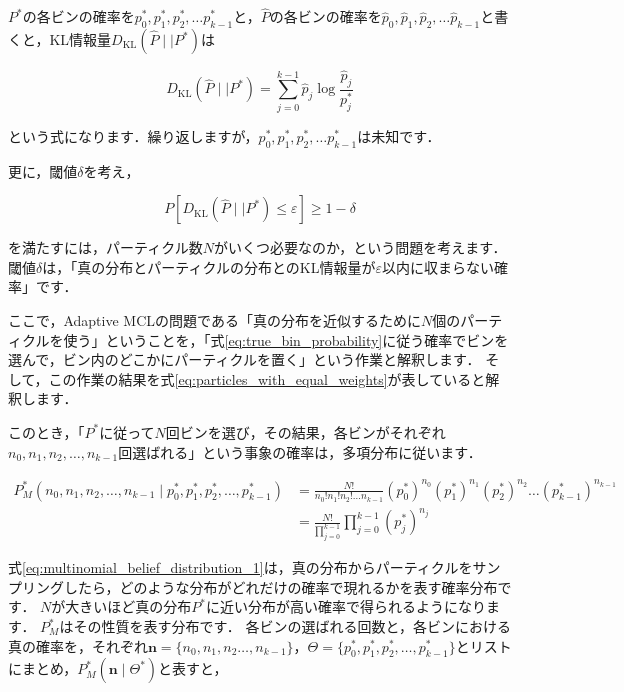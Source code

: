 \documentclass[{../../master}]{subfiles}
\begin{document}
$P^{*}$の各ビンの確率を$p^{*}_{0}, p^{*}_{1}, p^{*}_{2}, \ldots p^{*}_{k-1}$と，$\hat{P}$の各ビンの確率を$\hat{p}_{0}, \hat{p}_{1}, \hat{p}_{2}, \ldots \hat{p}_{k-1}$と書くと，KL情報量$D_{\text{KL}}(\hat{P} \mid\mid P^{*})$は

\begin{equation}
  D_{\text{KL}}(\hat{P} \mid\mid P^{*}) = \sum^{k-1}_{j=0} \hat{p}_{j}\log{\frac{\hat{p}_{j}}{p^{*}_j}}
\end{equation}

\noindent
という式になります．繰り返しますが，$p^{*}_{0}, p^{*}_{1}, p^{*}_{2}, \ldots p^{*}_{k-1}$は未知です．

更に，閾値$\delta$を考え，

\begin{equation}
  P[D_{\text{KL}}(\hat{P} \mid\mid P^{*}) \leq \varepsilon] \geq 1 - \delta
\end{equation}

\noindent
を満たすには，パーティクル数$N$がいくつ必要なのか，という問題を考えます．
閾値$\delta$は，「真の分布とパーティクルの分布とのKL情報量が$\varepsilon$以内に収まらない確率」です．

ここで，Adaptive MCLの問題である「真の分布を近似するために$N$個のパーティクルを使う」ということを，「式\ref{eq:true_bin_probability}に従う確率でビンを選んで，ビン内のどこかにパーティクルを置く」という作業と解釈します．
そして，この作業の結果を式\ref{eq:particles_with_equal_weights}が表していると解釈します．

このとき，「$P^{*}$に従って$N$回ビンを選び，その結果，各ビンがそれぞれ$n_0, n_1, n_2, \ldots , n_{k-1}$回選ばれる」という事象の確率は，多項分布に従います．

\begin{equation}
  \begin{split}
    P^{*}_{M}(n_0, n_1, n_2, \ldots , n_{k-1} \mid p^{*}_{0}, p^{*}_{1}, p^{*}_{2}, \ldots , p^{*}_{k-1}) &= \frac{N!}{n_{0}!n_{1}!n_{2}!\ldots n_{k-1}}(p^{*}_{0})^{n_{0}}(p^{*}_{1})^{n_{1}}(p^{*}_{2})^{n_{2}} \ldots (p^{*}_{k-1})^{n_{k-1}} \\
    &= \frac{N!}{\prod^{k-1}_{j=0}}\prod^{k-1}_{j=0}(p^{*}_{j})^{n_{j}}
  \end{split}
  \label{eq:multinomial_belief_distribution_1}
\end{equation}

式\ref{eq:multinomial_belief_distribution_1}は，真の分布からパーティクルをサンプリングしたら，どのような分布がどれだけの確率で現れるかを表す確率分布です．
$N$が大きいほど真の分布$P^{*}$に近い分布が高い確率で得られるようになります．
$P^{*}_{M}$はその性質を表す分布です．
各ビンの選ばれる回数と，各ビンにおける真の確率を，それぞれ$\bm{n} = \{n_{0}, n_{1}, n_{2} \ldots , n_{k-1}\}$，$\Theta = \{p^{*}_{0}, p^{*}_{1}, p^{*}_{2}, \ldots , p^{*}_{k-1}\}$とリストにまとめ，$P^{*}_{M}(\bm{n} \mid \Theta^{*})$と表すと，
\end{document}
